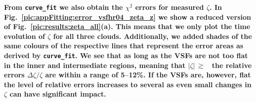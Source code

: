 \textbf{
    From \texttt{curve_fit} we also obtain the $\chi^2$ errors for measured $\zeta$. 
    In Fig.~\ref{pic:appFitting:error_vsfhr04_zeta_z} we show a reduced version of Fig.~\ref{pic:results:zeta_all}(a).
    This means that we only plot the time evolution of $\zeta$ for all three clouds.
    Additionally, we added shades of the same colours of the respective lines that represent the error areas as derived by \texttt{curve_fit}.
    We see that as long as the VSFs are not too flat in the inner and intermediate regions, meaning that $|\zeta|\,\gtrsim$~ the relative errors $\Delta \zeta / \zeta$ are within a range of 5--12\%. 
    If the VSFs are, however, flat the level of relative errors increases to several as even small changes in $\zeta$ can have significant impact. 
}





\endinput
